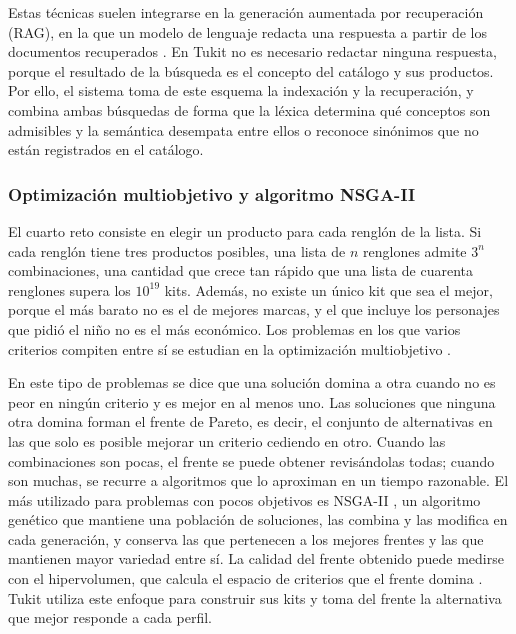 Estas técnicas suelen integrarse en la generación aumentada por recuperación (RAG), en la
que un modelo de lenguaje redacta una respuesta a partir de los documentos recuperados
\citep{lewis_retrieval-augmented_2020}. En Tukit no es necesario redactar ninguna respuesta,
porque el resultado de la búsqueda es el concepto del catálogo y sus productos. Por ello, el
sistema toma de este esquema la indexación y la recuperación, y combina ambas búsquedas de
forma que la léxica determina qué conceptos son admisibles y la semántica desempata entre
ellos o reconoce sinónimos que no están registrados en el catálogo.\par

\subsubsection{Optimización multiobjetivo y algoritmo NSGA-II}

El cuarto reto consiste en elegir un producto para cada renglón de la lista. Si cada renglón
tiene tres productos posibles, una lista de \(n\) renglones admite \(3^{n}\) combinaciones,
una cantidad que crece tan rápido que una lista de cuarenta renglones supera los
\(10^{19}\) kits. Además, no existe un único kit que sea el mejor, porque el más barato no
es el de mejores marcas, y el que incluye los personajes que pidió el niño no es el más
económico. Los problemas en los que varios criterios compiten entre sí se estudian en la
optimización multiobjetivo \citep{ehrgott_multiobjective_2002}.\par

En este tipo de problemas se dice que una solución domina a otra cuando no es peor en ningún
criterio y es mejor en al menos uno. Las soluciones que ninguna otra domina forman el frente
de Pareto, es decir, el conjunto de alternativas en las que solo es posible mejorar un
criterio cediendo en otro. Cuando las combinaciones son pocas, el frente se puede obtener
revisándolas todas; cuando son muchas, se recurre a algoritmos que lo aproximan en un tiempo
razonable. El más utilizado para problemas con pocos objetivos es NSGA-II
\citep{deb_fast_2002}, un algoritmo genético que mantiene una población de soluciones, las
combina y las modifica en cada generación, y conserva las que pertenecen a los mejores
frentes y las que mantienen mayor variedad entre sí. La calidad del frente obtenido puede
medirse con el hipervolumen, que calcula el espacio de criterios que el frente domina
\citep{zitzler_multiobjective_1999}. Tukit utiliza este enfoque para construir sus kits y
toma del frente la alternativa que mejor responde a cada perfil.\par

